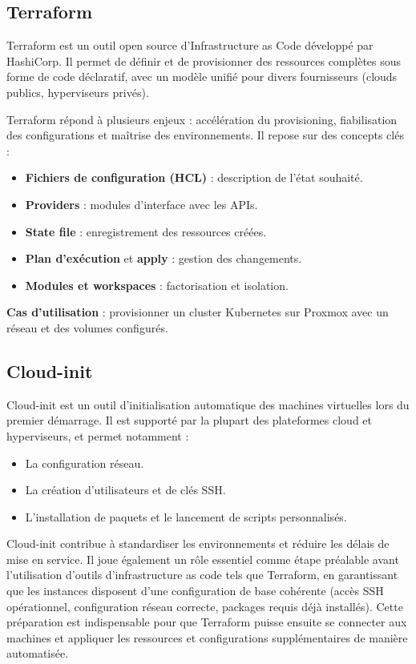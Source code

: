 \subsection{Terraform}

Terraform est un outil open source d’Infrastructure as Code développé par HashiCorp. Il permet de définir et de provisionner des ressources complètes sous forme de code déclaratif, avec un modèle unifié pour divers fournisseurs (clouds publics, hyperviseurs privés).

Terraform répond à plusieurs enjeux : accélération du provisioning, fiabilisation des configurations et maîtrise des environnements. Il repose sur des concepts clés :
\begin{itemize}
	\item \textbf{Fichiers de configuration (HCL)} : description de l’état souhaité.
	\item \textbf{Providers} : modules d’interface avec les APIs.
	\item \textbf{State file} : enregistrement des ressources créées.
	\item \textbf{Plan d’exécution} et \textbf{apply} : gestion des changements.
	\item \textbf{Modules et workspaces} : factorisation et isolation.
\end{itemize}

\textbf{Cas d’utilisation} : provisionner un cluster Kubernetes sur Proxmox avec un réseau et des volumes configurés.

\subsection{Cloud-init}

Cloud-init est un outil d’initialisation automatique des machines virtuelles lors du premier démarrage. Il est supporté par la plupart des plateformes cloud et hyperviseurs, et permet notamment :
\begin{itemize}
	\item La configuration réseau.
	\item La création d’utilisateurs et de clés SSH.
	\item L’installation de paquets et le lancement de scripts personnalisés.
\end{itemize}

Cloud-init contribue à standardiser les environnements et réduire les délais de mise en service. Il joue également un rôle essentiel comme étape préalable avant l’utilisation d’outils d’infrastructure as code tels que Terraform, en garantissant que les instances disposent d’une configuration de base cohérente (accès SSH opérationnel, configuration réseau correcte, packages requis déjà installés). Cette préparation est indispensable pour que Terraform puisse ensuite se connecter aux machines et appliquer les ressources et configurations supplémentaires de manière automatisée.

